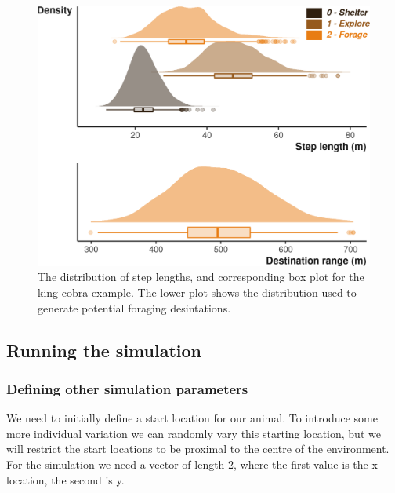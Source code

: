 \documentclass[10pt,a4paper]{article}
\begin{document}
\begin{figure}

{\centering \includegraphics{Agent-based_model_walkthrough_files/figure-latex/KINGCOBRAsettingMoveDesPlot-1} 

}

\caption{The distribution of step lengths, and corresponding box plot for the king cobra example. The lower plot shows the distribution used to generate potential foraging desintations.}\label{fig:KINGCOBRAsettingMoveDesPlot}
\end{figure}

\hypertarget{running-the-simulation}{%
\subsection{Running the simulation}\label{running-the-simulation}}

\hypertarget{defining-other-simulation-parameters}{%
\subsubsection{Defining other simulation parameters}\label{defining-other-simulation-parameters}}

We need to initially define a start location for our animal.
To introduce some more individual variation we can randomly vary this starting location, but we will restrict the start locations to be proximal to the centre of the environment.
For the simulation we need a vector of length 2, where the first value is the x location, the second is y.
\end{document}
